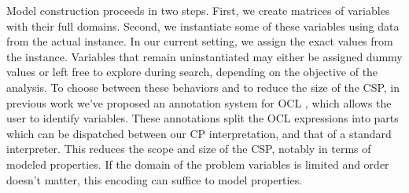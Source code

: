 Model construction proceeds in two steps. First, we create matrices of variables with their full domains. Second, we instantiate some of these variables using data from the actual instance. In our current setting, we assign the exact values from the instance. Variables that remain uninstantiated may either be assigned dummy values or left free to explore during search, depending on the objective of the analysis.
To choose between these behaviors and to reduce the size of the CSP, in previous work we've proposed an annotation system for OCL \cite{coyle_towards_2025}, which allows the user to identify variables. 
These annotations split the OCL expressions into parts which can be dispatched between our CP interpretation, and that of a standard interpreter.
This reduces the scope and size of the CSP, notably in terms of modeled properties.
If the domain of the problem variables is limited and order doesn't matter, this encoding can suffice to model properties. 



